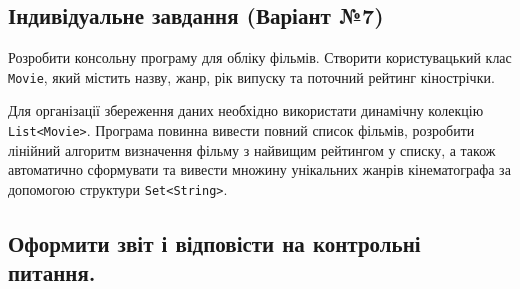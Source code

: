 \subsection{Індивідуальне завдання (Варіант №7)}

Розробити консольну програму для обліку фільмів. Створити користувацький 
клас \texttt{Movie}, який містить назву, жанр, рік випуску та поточний рейтинг 
кінострічки. 

Для організації збереження даних необхідно використати динамічну 
колекцію \texttt{List<Movie>}. Програма повинна вивести повний список фільмів, 
розробити лінійний алгоритм визначення фільму з найвищим рейтингом у списку, а 
також автоматично сформувати та вивести множину унікальних жанрів кінематографа 
за допомогою структури \texttt{Set<String>}.

\subsection{Оформити звіт і відповісти на контрольні питання.}


